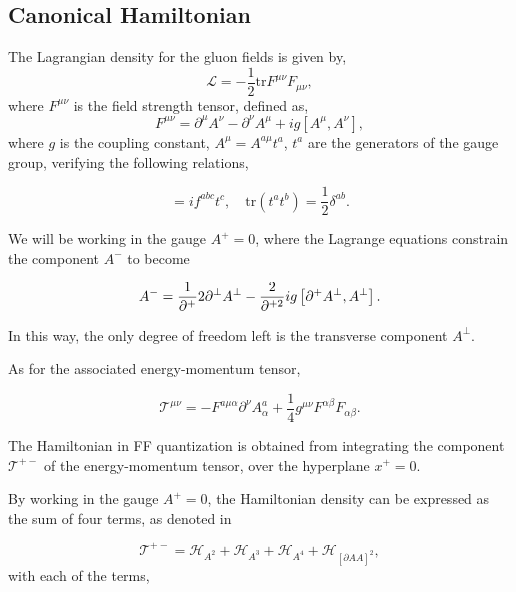 \documentclass[11pt,a4paper,twoside,pdf]{article}
\numberwithin{equation}{section}
\begin{document}
\subsection{Canonical Hamiltonian}

The Lagrangian density for the gluon fields is given by,
\begin{equation}
    \mathcal{L} = -\frac{1}{2}\text{tr}F^{\mu\nu}F_{\mu\nu},
\end{equation}
where $F^{\mu\nu}$ is the field strength tensor, defined as,
\begin{equation}
    F^{\mu\nu} = \partial^\mu A^\nu - \partial^\nu A^\mu + ig [A^\mu, A^\nu],
\end{equation}
where $g$ is the coupling constant, $A^\mu = A^{a\mu}t^a$, $t^a$ are the generators 
of the gauge group, verifying the following relations,

\begin{equation}
    [t^a, t^b] = i f^{abc} t^c, \quad \text{tr}(t^a t^b) = \frac{1}{2} \delta^{ab}.
\end{equation}

We will be working in the gauge $A^+=0$, where the Lagrange equations constrain
the component $A^-$ to become 

\begin{equation}
    A^- = \frac{1}{\partial^+}2 \partial^\perp A^\perp - \frac{2}{\partial^{+2}} ig 
    \left[ \partial^+ A^\perp, A^\perp \right].
\end{equation}

In this way, the only degree of freedom left is the transverse component $A^\perp$.

As for the associated energy-momentum tensor,

\begin{equation}
    \mathcal{T}^{\mu\nu} = -F^{a\mu\alpha}\partial^\nu A^a_\alpha + 
    \frac{1}{4}g^{\mu\nu}F^{\alpha\beta} F_{\alpha\beta}.
\end{equation}

The Hamiltonian in FF quantization is obtained from integrating the component
$\mathcal{T}^{+-}$ of the energy-momentum tensor, over the hyperplane $x^+=0$. 

By working in the gauge $A^+=0$, the Hamiltonian density can be expressed as the sum of 
four terms, as denoted in \cite{glazek_dynamics_2001}

\begin{equation}
    \mathcal{T}^{+-} = \mathcal{H}_{A^2} + \mathcal{H}_{A^3} +
    \mathcal{H}_{A^4} + \mathcal{H}_{[\partial AA]^2},
\end{equation}
with each of the terms, 
\end{document}
